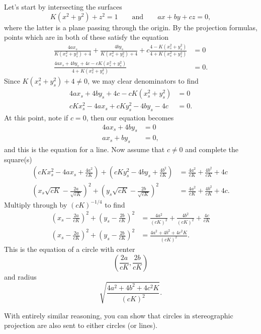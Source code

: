 \documentclass[newpage,hints,12pt,noauthor,nooutcomes]{ximera}
\begin{document}
\begin{problem}
\begin{freeResponse}
  Let's start by intersecting the surfaces
  \[
  K(x^2+y^2)+z^2=1\qquad\text{and}\qquad ax+by+cz=0,
  \]
  where the latter is a plane passing through the origin.  By the projection
  formulas, points which are in both of these satisfy the equation
\begin{align*}
\frac{4ax_s}{K(x_s^2 + y_s^2) + 4}+\frac{4by_s}{K(x_s^2 + y_s^2) + 4}+c\frac{4-K(x_s^2 + y_s^2)}{4+K(x_s^2 + y_s^2)}&=0\\
 \frac{4ax_s+4by_s+4c-cK(x_s^2 + y_s^2)}{4+K(x_s^2 + y_s^2)}&=0.
\end{align*}
Since $K\left(x_s^2 + y_s^2\right) + 4 \ne 0$, we may clear
denominators to find 
  \begin{align*}
    4ax_s+4by_s+4c-cK\left(x_s^2+y_s^2\right) &= 0\\
    cKx_s^2-4ax_s + cKy_s^2-4by_s-4c &= 0.
  \end{align*}
  At this point, note if $c=0$, then our equation becomes
  \begin{align*}
    4ax_s+4by_s &= 0\\
    ax_s + by_s &= 0,
  \end{align*}
  and this is the equation for a line. Now assume that $c\ne 0$ and
  complete the square(s)
  \begin{align*}
  \left(cKx_s^2 - 4ax_s + \frac{4a^2}{cK}\right) + \left(cKy_s^2 - 4by_s + \frac{4b^2}{cK}\right) &=
  \frac{4a^2}{cK} + \frac{4b^2}{cK} + 4c\\
  \left(x_s\sqrt{cK} - \frac{2a}{\sqrt{cK}}\right)^2 + \left(y_s\sqrt{cK} - \frac{2b}{\sqrt{cK}}\right)^2&=\frac{4a^2}{cK} + \frac{4b^2}{cK} + 4c.
  \end{align*}
  Multiply through by $(cK)^{-1/4}$ to find
  \begin{align*}
    \left(x_s - \frac{2a}{cK}\right)^2 + \left(y_s - \frac{2b}{cK}\right)^2 &= \frac{4a^2}{(cK)^2} + \frac{4b^2}{(cK)^2} + \frac{4c}{cK}\\
    \left(x_s - \frac{2a}{cK}\right)^2 + \left(y_s - \frac{2b}{cK}\right)^2 &= \frac{4a^2 + 4b^2 + 4c^2K}{(cK)^2}.
  \end{align*}
  This is the equation of a circle with center
  \[
  \left(\frac{2a}{cK}, \frac{2b}{cK}\right)
  \]
  and radius
  \[
  \sqrt{\frac{4a^2 + 4b^2 + 4c^2K}{(cK)^2}}.
  \]
\end{freeResponse}
\end{problem}



\begin{remark}
  With entirely similar reasoning, you can show that circles in
  stereographic projection are also sent to either circles (or lines).
\end{remark}
\end{document}
